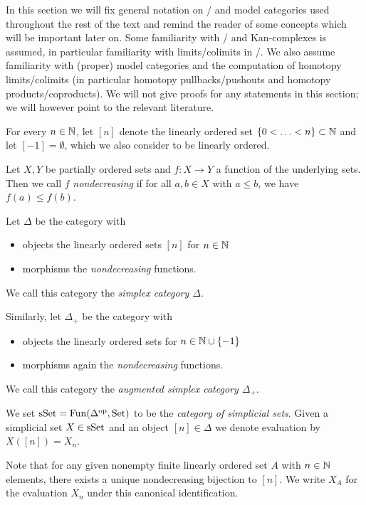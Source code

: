 In this section we will fix general notation on \inftycats/ and model categories used throughout the rest of the text and remind the reader of some concepts which will be important later on.
Some familiarity with \inftycats/ and Kan-complexes is assumed, in particular familiarity with limits/colimits in \inftycats/.
We also assume familiarity with (proper) model categories and the computation of homotopy limits/colimits (in particular homotopy pullbacks/pushouts and homotopy products/coproducts). 
We will not give proofs for any statements in this section; we will however point to the relevant literature.
\begin{definition}
    For every $n\in\mathbb{N}$, let $[n]$ denote the linearly ordered set $\left\lbrace0<\ldots<n\right\rbrace\subset\mathbb{N}$ and let $[-1]=\emptyset$, which we also consider to be linearly ordered.
\end{definition}
\begin{definition}
    Let $X,Y$ be partially ordered sets and $f\colon X\to Y$ a function of the underlying sets.
    Then we call $f$ \emph{nondecreasing} if for all $a,b\in X$ with $a\leq b$, we have $f(a)\leq f(b)$.
\end{definition}
\begin{definition}
    Let $\Delta$ be the category with
    \begin{itemize}
        \item objects the linearly ordered sets $[n]$ for $n\in\mathbb{N}$
        \item morphisms the \emph{nondecreasing} functions.
    \end{itemize}
    We call this category the \emph{simplex category $\Delta$}.

    Similarly, let $\Delta_+$ be the category with
    \begin{itemize}
        \item objects the linearly ordered sets for $n\in\mathbb{N}\cup\left\lbrace-1\right\rbrace$ 
        \item morphisms again the \emph{nondecreasing} functions.
    \end{itemize}
    We call this category the \emph{augmented simplex category $\Delta_+$}.
\end{definition}
\begin{definition}\label{def:simpSet} %
    We set $\operatorname{sSet}=\operatorname{Fun}(\Delta^{\operatorname{op}},\operatorname{Set})$ to be the \emph{category of simplicial sets}.
    Given a simplicial set $X\in\operatorname{sSet}$ and an object $[n]\in\Delta$ we denote evaluation by $X([n])=X_n$.

    Note that for any given nonempty finite linearly ordered set $A$ with $n\in\mathbb{N}$ elements, there exists a unique nondecreasing bijection to $[n]$.
    We write $X_A$ for the evaluation $X_n$ under this canonical identification. 
\end{definition}
